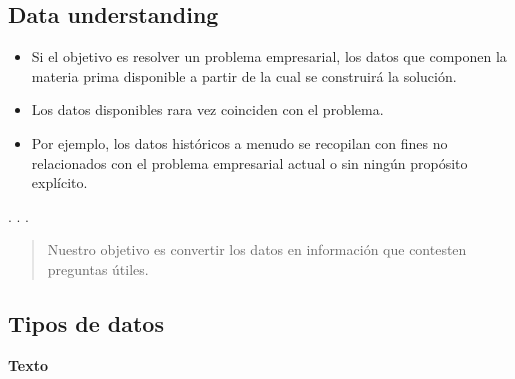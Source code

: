 \documentclass[
  letterpaper,
  DIV=11,
  numbers=noendperiod]{scrartcl}
\begin{document}
\hypertarget{data-understanding}{%
\subsection{Data understanding}\label{data-understanding}}

\begin{itemize}
\item
  Si el objetivo es resolver un problema empresarial, los datos que
  componen la materia prima disponible a partir de la cual se construirá
  la solución.
\item
  Los datos disponibles rara vez coinciden con el problema.
\item
  Por ejemplo, los datos históricos a menudo se recopilan con fines no
  relacionados con el problema empresarial actual o sin ningún propósito
  explícito.
\end{itemize}

. . .

\begin{quote}
Nuestro objetivo es convertir los datos en información que contesten
preguntas útiles.
\end{quote}

\hypertarget{tipos-de-datos}{%
\subsection{Tipos de datos}\label{tipos-de-datos}}

{\textbf{Texto}}
\end{document}
